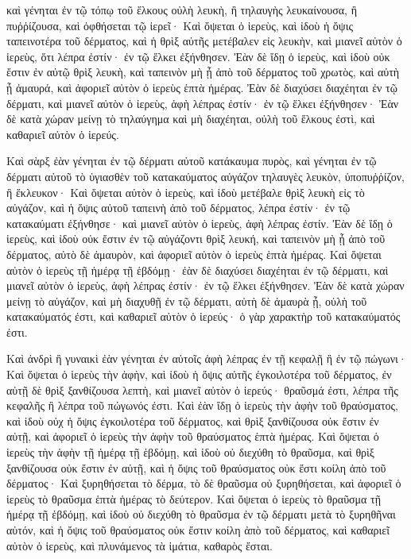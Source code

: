 {καὶ γένηται ἐν τῷ τόπῳ τοῦ ἕλκους οὐλὴ λευκὴ, ἢ τηλαυγὴς λευκαίνουσα, ἢ πυῤῥίζουσα, καὶ ὀφθήσεται τῷ ἱερεῖ·
Καὶ ὄψεται ὁ ἱερεὺς, καὶ ἰδοὺ ἡ ὄψις ταπεινοτέρα τοῦ δέρματος, καὶ ἡ θρὶξ αὐτῆς μετέβαλεν εἰς λευκὴν, καὶ μιανεῖ αὐτὸν ὁ ἱερεὺς, ὅτι λέπρα ἐστίν· ἐν τῷ ἕλκει ἐξήνθησεν.
Ἐὰν δὲ ἴδῃ ὁ ἱερεὺς, καὶ ἰδοὺ οὐκ ἔστιν ἐν αὐτῷ θρὶξ λευκὴ, καὶ ταπεινὸν μὴ ᾖ ἀπὸ τοῦ δέρματος τοῦ χρωτὸς, καὶ αὐτὴ ᾖ ἀμαυρά, καὶ ἀφοριεῖ αὐτὸν ὁ ἱερεὺς ἑπτὰ ἡμέρας.
Ἐὰν δὲ διαχύσει διαχέηται ἐν τῷ δέρματι, καὶ μιανεῖ αὐτὸν ὁ ἱερεὺς, ἁφὴ λέπρας ἐστίν· ἐν τῷ ἕλκει ἐξήνθησεν·
Ἐὰν δὲ κατὰ χώραν μείνῃ τὸ τηλαύγημα καὶ μὴ διαχέηται, οὐλὴ τοῦ ἕλκους ἐστὶ, καὶ καθαριεῖ αὐτὸν ὁ ἱερεύς.
\par }{\PP {}Καὶ σὰρξ ἐὰν γένηται ἐν τῷ δέρματι αὐτοῦ κατάκαυμα πυρὸς, καὶ γένηται ἐν τῷ δέρματι αὐτοῦ τὸ ὑγιασθὲν τοῦ κατακαύματος αὐγάζον τηλαυγὲς λευκὸν, ὑποπυῤῥίζον, ἢ ἔκλευκον·
Καὶ ὄψεται αὐτὸν ὁ ἱερεὺς, καὶ ἰδοὺ μετέβαλε θρὶξ λευκὴ εἰς τὸ αὐγάζον, καὶ ἡ ὄψις αὐτοῦ ταπεινὴ ἀπὸ τοῦ δέρματος, λέπρα ἐστίν· ἐν τῷ κατακαύματι ἐξήνθησε· καὶ μιανεῖ αὐτὸν ὁ ἱερεὺς, ἁφὴ λέπρας ἐστίν.
Ἐὰν δὲ ἴδῃ ὁ ἱερεὺς, καὶ ἰδοὺ οὐκ ἔστιν ἐν τῷ αὐγάζοντι θρὶξ λευκή, καὶ ταπεινὸν μὴ ᾖ ἀπὸ τοῦ δέρματος, αὐτὸ δὲ ἀμαυρὸν, καὶ ἀφοριεῖ αὐτὸν ὁ ἱερεὺς ἑπτὰ ἡμέρας.
Καὶ ὄψεται αὐτὸν ὁ ἱερεὺς τῇ ἡμέρᾳ τῇ ἑβδόμῃ· ἐὰν δὲ διαχύσει διαχέηται ἐν τῷ δέρματι, καὶ μιανεῖ αὐτὸν ὁ ἱερεὺς, ἁφὴ λέπρας ἐστίν· ἐν τῷ ἕλκει ἐξήνθησεν.
Ἐὰν δὲ κατὰ χώραν μείνῃ τὸ αὐγάζον, καὶ μὴ διαχυθῇ ἐν τῷ δέρματι, αὐτὴ δὲ ἀμαυρὰ ᾖ, οὐλὴ τοῦ κατακαύματός ἐστι, καὶ καθαριεῖ αὐτὸν ὁ ἱερεύς· ὁ γὰρ χαρακτὴρ τοῦ κατακαύματός ἐστι.
\par }{\PP {}Καὶ ἀνδρὶ ἢ γυναικὶ ἐὰν γένηται ἐν αὐτοῖς ἁφὴ λέπρας ἐν τῇ κεφαλῇ ἢ ἐν τῷ πώγωνι·
Καὶ ὄψεται ὁ ἱερεὺς τὴν ἁφὴν, καὶ ἰδοὺ ἡ ὄψις αὐτῆς ἐγκοιλοτέρα τοῦ δέρματος, ἐν αὐτῇ δὲ θρὶξ ξανθίζουσα λεπτὴ, καὶ μιανεῖ αὐτὸν ὁ ἱερεύς· θραῦσμά ἐστι, λέπρα τῆς κεφαλῆς ἢ λέπρα τοῦ πώγωνός ἐστι.
Καὶ ἐὰν ἴδῃ ὁ ἱερεὺς τὴν ἁφὴν τοῦ θραύσματος, καὶ ἰδοὺ οὐχ ἡ ὄψις ἐγκοιλοτέρα τοῦ δέρματος, καὶ θρὶξ ξανθίζουσα οὐκ ἔστιν ἐν αὐτῇ, καὶ ἀφοριεῖ ὁ ἱερεὺς τὴν ἁφὴν τοῦ θραύσματος ἑπτὰ ἡμέρας.
Καὶ ὄψεται ὁ ἱερεὺς τὴν ἁφὴν τῇ ἡμέρᾳ τῇ ἑβδόμῃ, καὶ ἰδοὺ οὐ διεχύθη τὸ θραῦσμα, καὶ θρὶξ ξανθίζουσα οὐκ ἔστιν ἐν αὐτῇ, καὶ ἡ ὄψις τοῦ θραύσματος οὐκ ἔστι κοίλη ἀπὸ τοῦ δέρματος·
Καὶ ξυρηθήσεται τὸ δέρμα, τὸ δὲ θραῦσμα οὐ ξυρηθήσεται, καὶ ἀφοριεῖ ὁ ἱερεὺς τὸ θραῦσμα ἑπτὰ ἡμέρας τὸ δεύτερον.
Καὶ ὄψεται ὁ ἱερεὺς τὸ θραῦσμα τῇ ἡμέρᾳ τῇ ἑβδόμῃ, καὶ ἰδοὺ οὐ διεχύθη τὸ θραῦσμα ἐν τῷ δέρματι μετὰ τὸ ξυρηθῆναι αὐτόν, καὶ ἡ ὄψις τοῦ θραύσματος οὐκ ἔστιν κοίλη ἀπὸ τοῦ δέρματος, καὶ καθαριεῖ αὐτὸν ὁ ἱερεὺς, καὶ πλυνάμενος τὰ ἱμάτια, καθαρὸς ἔσται.
}
